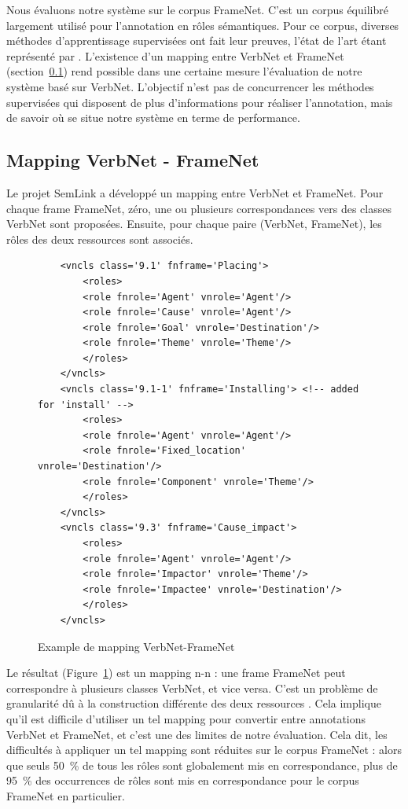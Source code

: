 Nous évaluons notre système sur le corpus FrameNet. C'est un corpus équilibré
largement utilisé pour l'annotation en rôles sémantiques. Pour ce corpus,
diverses méthodes d'apprentissage supervisées ont fait leur preuves, l'état de
l'art étant représenté par \cite{das2014frame}. L'existence d'un mapping entre
VerbNet et FrameNet (section~\ref{subsec:mapping}) rend possible dans une
certaine mesure l'évaluation de notre système basé sur VerbNet. L'objectif
n'est pas de concurrencer les méthodes supervisées qui disposent de plus
d'informations pour réaliser l'annotation, mais de savoir où se situe notre
système en terme de performance.

\subsection{Mapping VerbNet - FrameNet}
\label{subsec:mapping}

Le projet SemLink a développé un mapping entre VerbNet et FrameNet. Pour chaque
frame FrameNet, zéro, une ou plusieurs correspondances vers des classes VerbNet
sont proposées. Ensuite, pour chaque paire (VerbNet, FrameNet), les rôles des
deux ressources sont associés.

\begin{figure}[ht]
    \begin{verbatim}
    <vncls class='9.1' fnframe='Placing'>
        <roles>
        <role fnrole='Agent' vnrole='Agent'/>
        <role fnrole='Cause' vnrole='Agent'/>
        <role fnrole='Goal' vnrole='Destination'/>
        <role fnrole='Theme' vnrole='Theme'/>
        </roles>
    </vncls>
    <vncls class='9.1-1' fnframe='Installing'> <!-- added for 'install' -->
        <roles>
        <role fnrole='Agent' vnrole='Agent'/>
        <role fnrole='Fixed_location' vnrole='Destination'/>
        <role fnrole='Component' vnrole='Theme'/>
        </roles>
    </vncls>
    <vncls class='9.3' fnframe='Cause_impact'>
        <roles>
        <role fnrole='Agent' vnrole='Agent'/>
        <role fnrole='Impactor' vnrole='Theme'/>
        <role fnrole='Impactee' vnrole='Destination'/>
        </roles>
    </vncls>
    \end{verbatim}
    \caption{\label{fig:mapping}Example de mapping VerbNet-FrameNet}
\end{figure}

Le résultat (Figure~\ref{fig:mapping}) est un mapping n-n : une frame FrameNet
peut correspondre à plusieurs classes VerbNet, et vice versa. C'est un problème
de granularité dû à la construction différente des deux ressources
\citep{palmer2009semlink}. Cela implique qu'il est difficile d'utiliser un tel
mapping pour convertir entre annotations VerbNet et FrameNet, et c'est une des
limites de notre évaluation.  Cela dit, les difficultés à appliquer un tel
mapping sont réduites sur le corpus FrameNet : alors que seuls 50~\% de tous
les rôles sont globalement mis en correspondance, plus de 95~\% des occurrences
de rôles sont mis en correspondance pour le corpus FrameNet en particulier.

